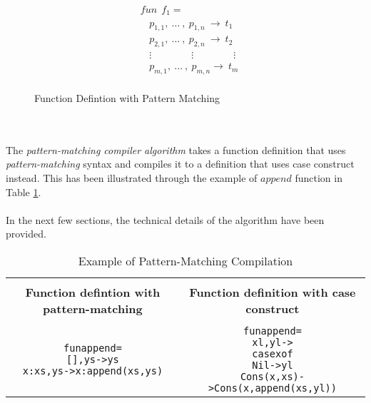 \documentclass[11pt]{article}
\begin{document}
\begin{figure}[h!]
\begin{align*} 
&fun~~f_1 = \\
&~~~~ p_{1,1},~\ldots~, ~ p_{1,n} ~\to ~t_1 \\
&~~~~ p_{2,1},~\ldots~, ~ p_{2,n} ~\to ~t_2 \\
&~~~~ \vdots \qquad\qquad \vdots\qquad\qquad \vdots \\ 
&~~~~ p_{m,1},~\ldots~, ~ p_{m,n} \to ~t_m \\
\end{align*} 
\caption{Function Defintion with Pattern Matching} \label{fig:Pmatch_fDefn}
\end{figure}
~~\\~~\\ 
The {\em pattern-matching compiler algorithm} takes a function definition that uses {\em pattern-matching} syntax and compiles it to a definition that uses {\sf case} construct instead. This has been illustrated through the example of $append$ function in Table \ref {Pmatch:Ex1}.
~~\\~~\\ 
In the next few sections, the technical details of the algorithm have been provided.
\begin{table}[h!]
\begin{center}
\begin{tabular}{|c|c|} \hline
{}& {}\\
{\bf Function defintion with pattern-matching} & {\bf Function definition with case construct} \\ 
{}& {}\\
\hline
\begin{minipage}{2.6in}
\begin{alltt}


fun append = 
  [],   ys   -> ys 
  x:xs, ys   -> x:append (xs,ys) 


\end{alltt}
\end {minipage} &
\begin{minipage}{3in}
\begin{alltt}



fun append = 
  xl,yl -> 
    case x of
      Nil -> yl
      Cons(x,xs) -> Cons(x,append(xs,yl))


\end{alltt} 
\end {minipage}
\tabularnewline
\hline
\end{tabular}
\caption{Example of Pattern-Matching Compilation}
\label{Pmatch:Ex1}
\end{center}
\end{table}
~~\\
\end{document}
